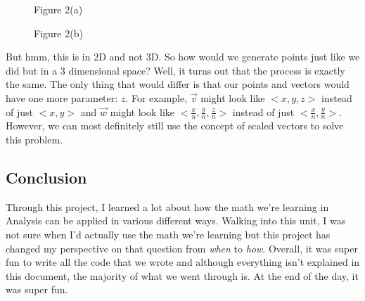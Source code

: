 \documentclass[14pt]{article}
\begin{document}
\begin{figure}[H]
\begin{center}
\begin{minipage}[b]{0.48\textwidth}
\begin{center}
			\end{center}
		\end{minipage}
	\end{center}
	\begin{center}
		\begin{minipage}[t]{0.48\textwidth}
			\caption*{Figure 2(a)}
		\end{minipage}
		\hfill
		\begin{minipage}[t]{0.48\textwidth}
			\caption*{Figure 2(b)}
		\end{minipage}
	\end{center}
\end{figure}

But hmm, this is in 2D and not 3D. So how would we generate points just like we did but in a 3 dimensional space? Well, it turns out that the process is exactly the same. The only thing that would differ is that our points and vectors would have one more parameter: $z$. For example, $\overrightarrow{v}$ might look like $<x, y, z>$ instead of just $<x, y>$ and $\overrightarrow{w}$ might look like $<\frac{x}{n}, \frac{y}{n}, \frac{z}{n}>$ instead of just $<\frac{x}{n}, \frac{y}{n}>$. However, we can most definitely still use the concept of scaled vectors to solve this problem.

\subsection*{Conclusion}

Through this project, I learned a lot about how the math we're learning in Analysis can be applied in various different ways. Walking into this unit, I was not sure when I'd actually use the math we're learning but this project has changed my perspective on that question from \textit{when} to \textit{how}. Overall, it was super fun to write all the code that we wrote and although everything isn't explained in this document, the majority of what we went through is. At the end of the day, it was super fun.
\end{document}
